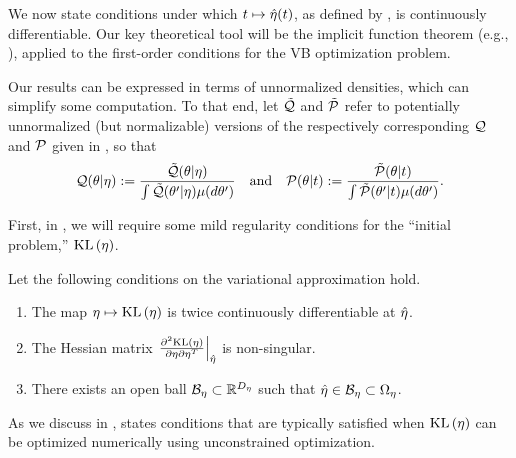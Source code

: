 We now state conditions under which $t \mapsto \hat\eta(t)$, as defined by
, is continuously differentiable.  Our key theoretical tool will
be the implicit function theorem (e.g., \citet{krantz:2012:implicit}), applied
to the first-order conditions for the VB optimization problem.

Our results can be expressed in terms of unnormalized densities, which can
simplify some computation.  To that end, let $\tilde{\mathcal{Q}}$ and $\tilde{\mathcal{P}}$ refer to
potentially unnormalized (but normalizable) versions of the respectively
corresponding $\mathcal{Q}$ and $\mathcal{P}$ given in , so that
%
\begin{align*}
%
\q(\theta \vert \eta) :={}
    \frac{\qtil(\theta \vert \eta)}
    {\int \qtil(\theta' \vert \eta) \mu(d\theta')} \mathand
\p(\theta \vert \t) :={}
    \frac{\ptil(\theta \vert \t)}
    {\int \ptil(\theta' \vert \t) \mu(d\theta')}.
%
\end{align*}

First, in , we will require some mild regularity conditions
for the ``initial problem,'' $\mathrm{KL}\left(\eta\right)$.

\begin{assu}
%
Let the following conditions on the variational approximation hold.
%
\begin{enumerate}
%
    \item {} The map $\eta \mapsto \mathrm{KL}\left(\eta\right)$ is twice
    continuously differentiable at $\hat\eta$.

    \item{} The Hessian matrix $\left.\frac{\partial^2 \mathrm{KL}\left(\eta\right)}{\partial \eta \partial \eta^T}\right\vert_{\hat\eta}$ is non-singular.

    \item {} There exists an open ball $\mathcal{B}_\eta
    \subset \mathbb{R}^{D_{\eta}}$ such that $\hat\eta \in \mathcal{B}_\eta \subset
    \Omega_{\eta}$.
%
\end{enumerate}
%
\end{assu}

As we discuss in ,  states
conditions that are typically satisfied when $\mathrm{KL}\left(\eta\right)$ can be optimized
numerically using unconstrained optimization.


